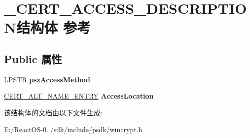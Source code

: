 \hypertarget{struct___c_e_r_t___a_c_c_e_s_s___d_e_s_c_r_i_p_t_i_o_n}{}\section{\+\_\+\+C\+E\+R\+T\+\_\+\+A\+C\+C\+E\+S\+S\+\_\+\+D\+E\+S\+C\+R\+I\+P\+T\+I\+O\+N结构体 参考}
\label{struct___c_e_r_t___a_c_c_e_s_s___d_e_s_c_r_i_p_t_i_o_n}
\subsection*{Public 属性}
\begin{DoxyCompactItemize}
\item 
\mbox{\label{struct___c_e_r_t___a_c_c_e_s_s___d_e_s_c_r_i_p_t_i_o_n_a50b9849548bebf7197c5ee5ff2255624}} 
L\+P\+S\+TR {\bfseries psz\+Access\+Method}
\item 
\mbox{\label{struct___c_e_r_t___a_c_c_e_s_s___d_e_s_c_r_i_p_t_i_o_n_a737cd0f9fa8272659131440cb9fe5248}} 
\hyperlink{struct___c_e_r_t___a_l_t___n_a_m_e___e_n_t_r_y}{C\+E\+R\+T\+\_\+\+A\+L\+T\+\_\+\+N\+A\+M\+E\+\_\+\+E\+N\+T\+RY} {\bfseries Access\+Location}
\end{DoxyCompactItemize}


该结构体的文档由以下文件生成\+:\begin{DoxyCompactItemize}
\item 
E\+:/\+React\+O\+S-\/0../sdk/include/psdk/wincrypt.\+h\end{DoxyCompactItemize}
